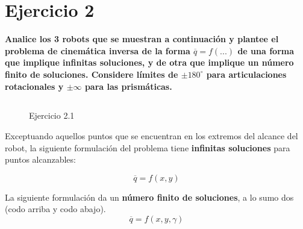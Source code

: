\documentclass[a4paper,12pt]{article}
\begin{document}
\section{Ejercicio 2}
\textbf{Analice los 3 robots que se muestran a continuación y plantee el problema de
cinemática inversa de la forma $\overline{q} = f(...)$ de una forma que implique infinitas soluciones, y de
otra que implique un número finito de soluciones. Considere límites de $\pm 180^\circ$ para
articulaciones rotacionales y $\pm\infty$ para las prismáticas.}
\subsection{}
\begin{figure}[H]
    \centering
    \begin{adjustbox}{scale = 0.55, max width=\columnwidth}
    \end{adjustbox}
    \caption{Ejercicio 2.1}
\end{figure}

Exceptuando aquellos puntos que se encuentran en los extremos del alcance del robot, la siguiente formulación del problema
tiene \textbf{infinitas soluciones} para puntos alcanzables:

\begin{equation*}
    \overline{q} = f(x, y)
\end{equation*}

La siguiente formulación da un \textbf{número finito de soluciones}, a lo sumo dos (codo arriba y codo abajo).
\begin{equation}
    \overline{q} = f(x, y, \gamma)
    \label{problema RRR}
\end{equation}
\end{document}
